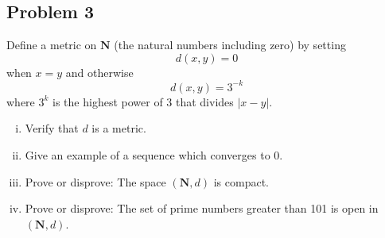 \documentclass[12pt]{article}
\theoremstyle{definition}
\begin{document}
\subsection{Problem 3 \texorpdfstring{\cite{Ricky}}{}}
Define a metric on $\mathbf{N}$ (the natural numbers including zero) by setting 
\[
    d(x,y) = 0
\]
when $x = y$ and otherwise 
\[
    d(x,y) = 3^{-k}
\]
where $3^k$ is the highest power of 3 that divides $|x-y|$.
\begin{enumerate}[(i)]
    \item Verify that $d$ is a metric. 
    \item Give an example of a sequence which converges to $0$.
    \item Prove or disprove: The space $(\mathbf{N},d)$ is compact.
    \item Prove or disprove: The set of prime numbers greater than 101 is open in $(\mathbf{N},d)$.
\end{enumerate}
\end{document}
